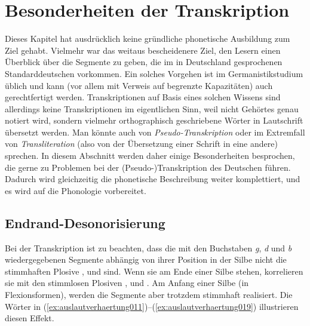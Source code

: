 \section{Besonderheiten der Transkription}
\label{sec:besonderheitendertranskription}


Dieses Kapitel hat ausdrücklich keine gründliche phonetische Ausbildung zum Ziel gehabt.
Vielmehr war das weitaus bescheidenere Ziel, den Lesern einen Überblick über die Segmente zu geben, die im in Deutschland gesprochenen Standarddeutschen vorkommen.
Ein solches Vorgehen ist im Germanistikstudium üblich und kann (vor allem mit Verweis auf begrenzte Kapazitäten) auch gerechtfertigt werden.
Transkriptionen auf Basis eines solchen Wissens sind allerdings keine Transkriptionen im eigentlichen Sinn, weil nicht Gehörtes genau notiert wird, sondern vielmehr orthographisch geschriebene Wörter in Lautschrift übersetzt werden.
Man könnte auch von \textit{Pseudo-Transkription} oder im Extremfall von \textit{Transliteration} (also von der Übersetzung einer Schrift in eine andere) sprechen.
In diesem Abschnitt werden daher einige Besonderheiten besprochen, die gerne zu Problemen bei der (Pseudo-)Transkription des Deutschen führen.
Dadurch wird gleichzeitig die phonetische Beschreibung weiter komplettiert, und es wird auf die Phonologie vorbereitet.

\subsection{Endrand-Desonorisierung}
\label{sec:endranddesonorisierung1}


Bei der Transkription ist zu beachten, dass die mit den Buchstaben \textit{g}, \textit{d} und \textit{b} wiedergegebenen Segmente abhängig von ihrer Position in der Silbe nicht die stimmhaften Plosive \textipa{[g]}, \textipa{[d]} und \textipa{[b]} sind.
Wenn sie am Ende einer Silbe stehen, korrelieren sie mit den stimmlosen Plosiven \textipa{[k]}, \textipa{[t]} und \textipa{[p]}.
Am Anfang einer Silbe (\zB in Flexionsformen), werden die Segmente aber trotzdem stimmhaft realisiert.
Die Wörter in (\ref{ex:auslautverhaertung011})--(\ref{ex:auslautverhaertung019}) illustrieren diesen Effekt.

